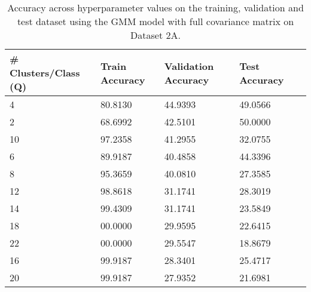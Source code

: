 \begin{table}[H]
\centering
\begin{tabular}{l l l l l}
\hline
\hline
\textbf{\# Clusters/Class (Q)} & \textbf{Train Accuracy} & \textbf{Validation Accuracy} & \textbf{Test Accuracy} \\
\hline
\hline
4 & 80.8130 & 44.9393 & 49.0566 \\
2 & 68.6992 & 42.5101 & 50.0000 \\
10 & 97.2358 & 41.2955 & 32.0755 \\
6 & 89.9187 & 40.4858 & 44.3396 \\
8 & 95.3659 & 40.0810 & 27.3585 \\
12 & 98.8618 & 31.1741 & 28.3019 \\
14 & 99.4309 & 31.1741 & 23.5849 \\
18 & 00.0000 & 29.9595 & 22.6415 \\
22 & 00.0000 & 29.5547 & 18.8679 \\
16 & 99.9187 & 28.3401 & 25.4717 \\
20 & 99.9187 & 27.9352 & 21.6981 \\
\hline
\end{tabular}
\caption{Accuracy across hyperparameter values on the training, validation and test dataset using the GMM model with full covariance matrix on Dataset 2A.}
\label{tab:1b_full}
\end{table}

